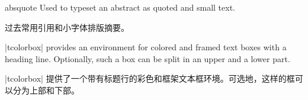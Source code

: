 \begin{docEnvironment}{absquote}{}
Used to typeset an abstract as quoted and small text.

过去常用引用和小字体排版摘要。
\begin{dispExample}
\begin{absquote}
|tcolorbox| provides an environment for colored and framed text boxes with a
heading line. Optionally, such a box can be split in an upper and a lower part.

|tcolorbox| 提供了一个带有标题行的彩色和框架文本框环境。可选地，这样的框可以分为上部和下部。
\end{absquote}
\end{dispExample}
\end{docEnvironment}